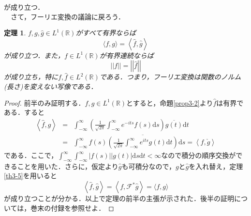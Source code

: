 \documentclass[a4j]{jsbook}
\newtheorem{theorem}{定理}
\numberwithin{theorem}{chapter}  %
\begin{document}
が成り立つ．\\
　さて，フーリエ変換の議論に戻ろう．
\begin{theorem} 
\label{th3-7}
\(f, g, \hat{g}\in L^1(\mathbb{R})\)がすべて有界ならば
\begin{equation*}
    \langle f, g\rangle=\left\langle\hat{f}, \hat{g}\right\rangle
\end{equation*}
が成り立つ．また，\(f\in L^1(\mathbb{R})\)が有界連続ならば
\begin{equation*}
    ||f||=\left|\left|\hat{f}\right|\right|
\end{equation*}
が成り立ち，特に\(f, \hat{f}\in L^2(\mathbb{R})\)である．つまり，フーリエ変換は関数のノルム(長さ)を変えない写像である．
\end{theorem}
\begin{proof}
前半のみ証明する．\(f, g\in L^1(\mathbb{R})\)とすると，命題\ref{prop3-2}より\(\hat{f}\)は有界である．すると
\begin{eqnarray*}
\left\langle\hat{f}, g\right\rangle&=&\int_{-\infty}^\infty\left(\frac{1}{\sqrt{2\pi}}\int_{-\infty}^\infty e^{-its}f(s)\mathrm{d}s\right)\overline{g(t)}\mathrm{d}t \\
&=&\int_{-\infty}^\infty f(s)\overline{\left(\frac{1}{\sqrt{2\pi}}\int_{-\infty}^\infty e^{its}g(t)\mathrm{d}t\right)}\mathrm{d}s=\left\langle f, \check{g}\right\rangle
\end{eqnarray*}
である．ここで，\(\displaystyle\int_{-\infty}^\infty\int_{-\infty}^\infty|f(s)||g(t)|\mathrm{d}s\mathrm{d}t<\infty\)なので積分の順序交換ができることを用いた．さらに，仮定より\(\hat{g}\)も可積分なので，\(g\)と\(\hat{g}\)を入れ替え，定理\ref{th3-5}を用いると
\begin{equation*}
    \left\langle\hat{f}, \hat{g}\right\rangle=\left\langle f, \mathcal{F}^*\hat{g}\right\rangle=\langle f, g\rangle
\end{equation*}
が成り立つことが分かる．以上で定理の前半の主張が示された．後半の証明については，巻末の付録を参照せよ．
\end{proof}
\end{document}
